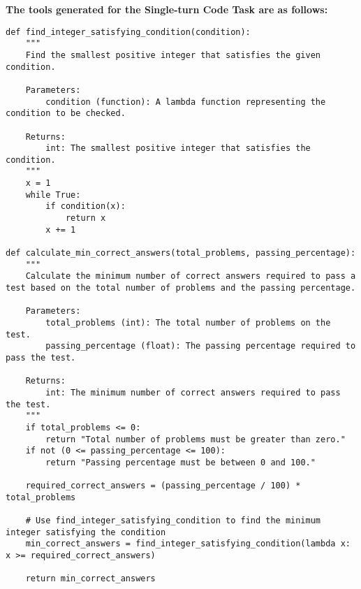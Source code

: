 \textbf{The tools generated for the Single-turn Code Task are as follows:}
\begin{tcolorbox}[title=Tools for MATH, width=\textwidth,top=0mm, breakable]
\begin{Verbatim}[breaklines=true, breakanywhere=true, fontsize=\footnotesize]
def find_integer_satisfying_condition(condition):
    """
    Find the smallest positive integer that satisfies the given condition.

    Parameters:
        condition (function): A lambda function representing the condition to be checked.

    Returns:
        int: The smallest positive integer that satisfies the condition.
    """
    x = 1
    while True:
        if condition(x):
            return x
        x += 1

def calculate_min_correct_answers(total_problems, passing_percentage):
    """
    Calculate the minimum number of correct answers required to pass a test based on the total number of problems and the passing percentage.

    Parameters:
        total_problems (int): The total number of problems on the test.
        passing_percentage (float): The passing percentage required to pass the test.

    Returns:
        int: The minimum number of correct answers required to pass the test.
    """
    if total_problems <= 0:
        return "Total number of problems must be greater than zero."
    if not (0 <= passing_percentage <= 100):
        return "Passing percentage must be between 0 and 100."

    required_correct_answers = (passing_percentage / 100) * total_problems

    # Use find_integer_satisfying_condition to find the minimum integer satisfying the condition
    min_correct_answers = find_integer_satisfying_condition(lambda x: x >= required_correct_answers)
    
    return min_correct_answers
\end{Verbatim}
\end{tcolorbox}

